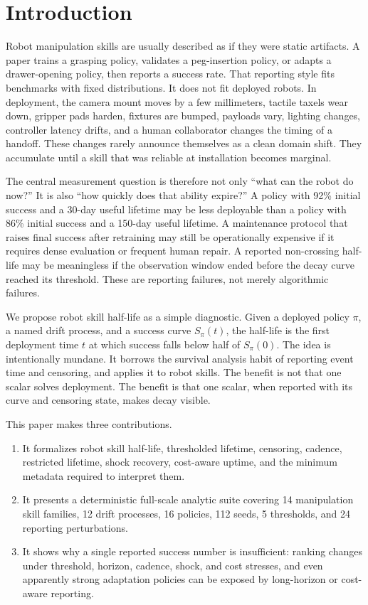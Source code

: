 \documentclass{article}
\newcommand{\success}{S_\pi}
\begin{document}
\section{Introduction}

Robot manipulation skills are usually described as if they were static
artifacts. A paper trains a grasping policy, validates a peg-insertion policy,
or adapts a drawer-opening policy, then reports a success rate. That reporting
style fits benchmarks with fixed distributions. It does not fit deployed
robots. In deployment, the camera mount moves by a few millimeters, tactile
taxels wear down, gripper pads harden, fixtures are bumped, payloads vary,
lighting changes, controller latency drifts, and a human collaborator changes
the timing of a handoff. These changes rarely announce themselves as a clean
domain shift. They accumulate until a skill that was reliable at installation
becomes marginal.

The central measurement question is therefore not only ``what can the robot do
now?'' It is also ``how quickly does that ability expire?'' A policy with 92\%
initial success and a 30-day useful lifetime may be less deployable than a
policy with 86\% initial success and a 150-day useful lifetime. A maintenance
protocol that raises final success after retraining may still be operationally
expensive if it requires dense evaluation or frequent human repair. A reported
non-crossing half-life may be meaningless if the observation window ended before
the decay curve reached its threshold. These are reporting failures, not merely
algorithmic failures.

We propose robot skill half-life as a simple diagnostic. Given a deployed policy
$\pi$, a named drift process, and a success curve $\success(t)$, the half-life
is the first deployment time $t$ at which success falls below half of
$\success(0)$. The idea is intentionally mundane. It borrows the survival
analysis habit of reporting event time and censoring, and applies it to robot
skills. The benefit is not that one scalar solves deployment. The benefit is
that one scalar, when reported with its curve and censoring state, makes decay
visible.

This paper makes three contributions.
\begin{enumerate}
    \item It formalizes robot skill half-life, thresholded lifetime, censoring,
    cadence, restricted lifetime, shock recovery, cost-aware uptime, and the
    minimum metadata required to interpret them.
    \item It presents a deterministic full-scale analytic suite covering 14
    manipulation skill families, 12 drift processes, 16 policies, 112 seeds, 5
    thresholds, and 24 reporting perturbations.
    \item It shows why a single reported success number is insufficient:
    ranking changes under threshold, horizon, cadence, shock, and cost
    stresses, and even apparently strong adaptation policies can be exposed by
    long-horizon or cost-aware reporting.
\end{enumerate}
\end{document}
